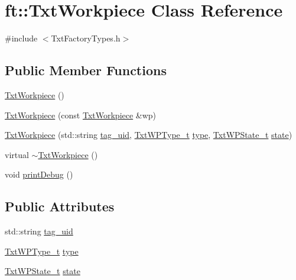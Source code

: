 \hypertarget{classft_1_1_txt_workpiece}{}\section{ft\+:\+:Txt\+Workpiece Class Reference}
\label{classft_1_1_txt_workpiece}


{\ttfamily \#include $<$Txt\+Factory\+Types.\+h$>$}

\subsection*{Public Member Functions}
\begin{DoxyCompactItemize}
\item 
\hyperlink{classft_1_1_txt_workpiece_a342e8eeae1f3cee8827a46032a69386d}{Txt\+Workpiece} ()
\item 
\hyperlink{classft_1_1_txt_workpiece_ada60faeb1897b6279271b24421f549be}{Txt\+Workpiece} (const \hyperlink{classft_1_1_txt_workpiece}{Txt\+Workpiece} \&wp)
\item 
\hyperlink{classft_1_1_txt_workpiece_a86b73fcacf544a67736f06892c85a5d4}{Txt\+Workpiece} (std\+::string \hyperlink{classft_1_1_txt_workpiece_a769f66288219e6064b61feae0e8b7276}{tag\+\_\+uid}, \hyperlink{namespaceft_a2d5bf01b2da29de3c061682f3195b5b2}{Txt\+W\+P\+Type\+\_\+t} \hyperlink{classft_1_1_txt_workpiece_a9bddfb2e5f00c930f9c2967d224c6c1f}{type}, \hyperlink{namespaceft_ac089be1d932165fc32bd3838c892bce9}{Txt\+W\+P\+State\+\_\+t} \hyperlink{classft_1_1_txt_workpiece_ac252dfab889507a20c74dd8a1b24fe66}{state})
\item 
virtual \hyperlink{classft_1_1_txt_workpiece_afeed9e7e5ea9ecbbb38a812683049058}{$\sim$\+Txt\+Workpiece} ()
\item 
void \hyperlink{classft_1_1_txt_workpiece_a92c1de9ee125041b70898af41fc0b542}{print\+Debug} ()
\end{DoxyCompactItemize}
\subsection*{Public Attributes}
\begin{DoxyCompactItemize}
\item 
std\+::string \hyperlink{classft_1_1_txt_workpiece_a769f66288219e6064b61feae0e8b7276}{tag\+\_\+uid}
\item 
\hyperlink{namespaceft_a2d5bf01b2da29de3c061682f3195b5b2}{Txt\+W\+P\+Type\+\_\+t} \hyperlink{classft_1_1_txt_workpiece_a9bddfb2e5f00c930f9c2967d224c6c1f}{type}
\item 
\hyperlink{namespaceft_ac089be1d932165fc32bd3838c892bce9}{Txt\+W\+P\+State\+\_\+t} \hyperlink{classft_1_1_txt_workpiece_ac252dfab889507a20c74dd8a1b24fe66}{state}
\end{DoxyCompactItemize}


